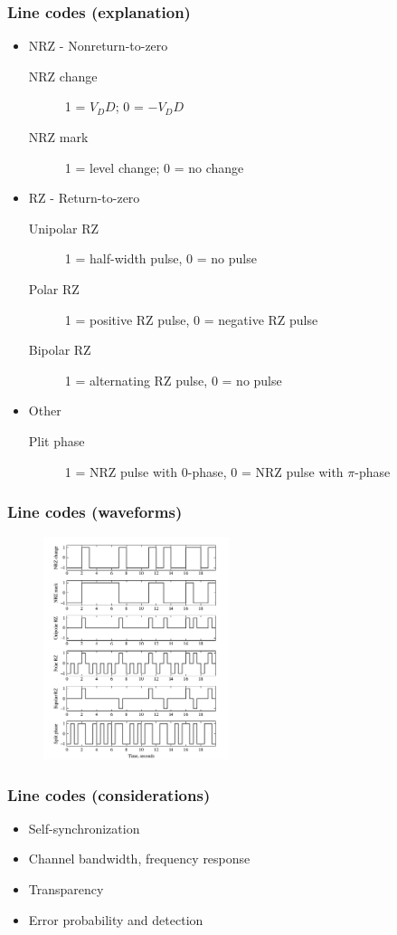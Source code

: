 \documentclass{beamer}
\begin{document}
	\begin{frame}
		\frametitle{Line codes (explanation)}
		\begin{itemize}
			\item NRZ - Nonreturn-to-zero
			\begin{description}
				\item [NRZ change] 1 = $V_DD$; 0 = $-V_DD$
				\item [NRZ mark] 1 = level change;  0 = no change
			\end{description}
			\item RZ - Return-to-zero
			\begin{description}
				\item [Unipolar RZ] 1 = half-width pulse, 0 = no pulse
				\item [Polar RZ] 1 = positive RZ pulse, 0 = negative RZ pulse
				\item [Bipolar RZ] 1 = alternating RZ pulse, 0 = no pulse
			\end{description}
			\item Other
			\begin{description}
				\item [Plit phase] 1 = NRZ pulse with 0-phase, 0 = NRZ pulse with $\pi$-phase
			\end{description}
		\end{itemize}
	\end{frame}

	\begin{frame}
		\frametitle{Line codes (waveforms)}
		\begin{figure}
			\includegraphics[width=\textwidth,height= 6.5cm,keepaspectratio,center]{line_codes.png}
		\end{figure}
	\end{frame}

	\begin{frame}
		\frametitle{Line codes (considerations)}
		\begin{itemize}
			\item Self-synchronization
			\item Channel bandwidth, frequency response
			\item Transparency
			\item Error probability and detection
		\end{itemize}
	\end{frame}
\end{document}
